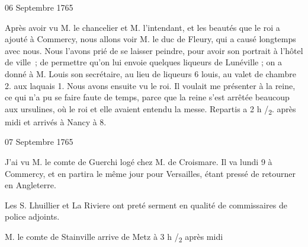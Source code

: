                      \begin{diary}{06 Septembre 1765}{}
                        
                         Après avoir vu M. le chancelier et M.
                              l'intendant, et les beautés que le roi a ajouté
                           à Commercy, nous allons voir
                              M. le duc de
                              Fleury, qui a causé longtemps avec nous. Nous
                           l'avons prié de se laisser peindre, pour avoir
                           son portrait à l'hôtel de
                              ville ; de permettre
                           qu'on lui envoie quelques liqueurs de Lunéville ;
                           on a donné à M. Louis son
                           secrétaire, au
                           lieu de liqueurs 6 louis, au valet de chambre
                           2. aux
                           laquais 1.
                           Nous avons ensuite vu
                           le roi. Il voulait me
                           présenter à la reine,
                           ce qui n'a pu se faire faute de temps,
                           parce que la reine
                           s'est arrêtée beaucoup
                           aux ursulines, où le roi et elle avaient
                           entendu la messe. Repartis a 2 h /\textsubscript{2}. après
                           midi et arrivés à Nancy à 8.
                        \bigskip
        
        
                     \end{diary}

                     \begin{diary}{07 Septembre 1765}{}
                        
                         J'ai vu M. le
                              comte de Guerchi logé chez
                           M. de Croismare. Il va lundi 9 à
                           Commercy, et en partira le
                           même jour pour
                           Versailles, étant pressé
                           de retourner en Angleterre. \bigskip
        
        
                         Les S.
                           Lhuillier et La Riviere ont preté
                           serment en qualité de commissaires de police
                           adjoints. \bigskip
        
        
                        
                           M. le comte de Stainville arrive
                           de Metz à
                           3 h /\textsubscript{2}
                           après midi \bigskip
        
        
                     \end{diary}
                     

